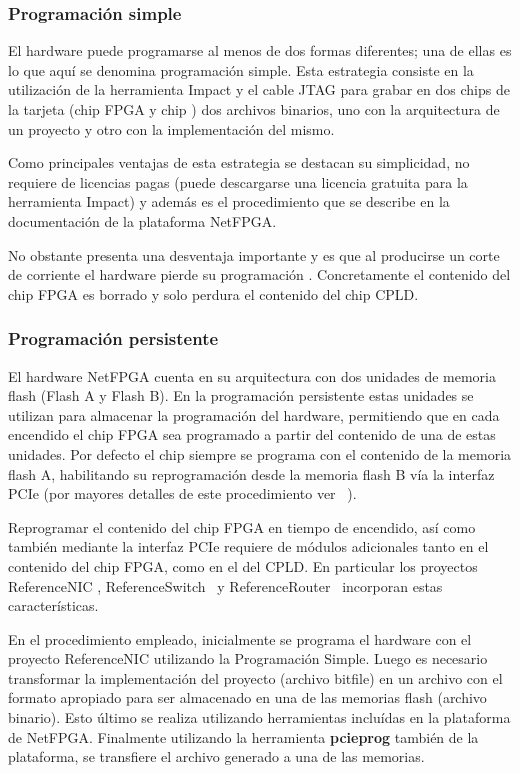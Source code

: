 \subsubsection{Programaci\'on simple}
El hardware puede programarse al menos de dos formas diferentes; una de ellas es lo que aqu\'i se denomina programaci\'on simple. Esta estrategia consiste en la utilizaci\'on de la herramienta Impact y el cable JTAG para grabar en dos chips de la tarjeta (chip FPGA y chip ) dos archivos binarios, uno con la arquitectura de un proyecto y otro con la implementaci\'on del mismo.

Como principales ventajas de esta estrategia se destacan su simplicidad, no requiere de licencias pagas (puede descargarse una licencia gratuita para la herramienta Impact) y adem\'as es el procedimiento que se describe en la documentaci\'on de la plataforma NetFPGA.

No obstante presenta una desventaja importante y es que al producirse un corte de corriente el hardware pierde su programación . Concretamente el contenido del chip FPGA es borrado y solo perdura el contenido del chip CPLD.

\subsubsection{Programaci\'on persistente}
El hardware NetFPGA cuenta en su arquitectura con dos unidades de memoria flash (Flash A y Flash B). En la programaci\'on persistente estas unidades se utilizan para almacenar la programaci\'on del hardware, permitiendo que en cada encendido el chip FPGA sea programado a partir del contenido de una de estas unidades. Por defecto el chip siempre se programa con el contenido de la memoria flash A, habilitando su reprogramaci\'on desde la memoria flash B v\'ia la interfaz PCIe (por mayores detalles de este procedimiento ver ~\citep{PCIEProgProject}).

Reprogramar el contenido del chip FPGA en tiempo de encendido, así como también mediante la interfaz PCIe requiere de módulos adicionales tanto en el contenido del chip FPGA, como en el del CPLD. En particular los proyectos ReferenceNIC \citep{ReferenceNICProject}, ReferenceSwitch~\citep{ReferenceSwitchProject} y ReferenceRouter~\citep{ReferenceRouterProject} incorporan estas características.

En el procedimiento empleado, inicialmente se programa el hardware con el proyecto ReferenceNIC utilizando la Programaci\'on Simple. Luego es necesario transformar la implementaci\'on del proyecto (archivo bitfile) en un archivo con el formato apropiado para ser almacenado en una de las memorias flash (archivo binario). Esto \'ultimo se realiza utilizando herramientas inclu\'idas en la plataforma de NetFPGA. Finalmente utilizando la herramienta \textbf{pcieprog} también de la plataforma, se transfiere el archivo generado a una de las memorias.


